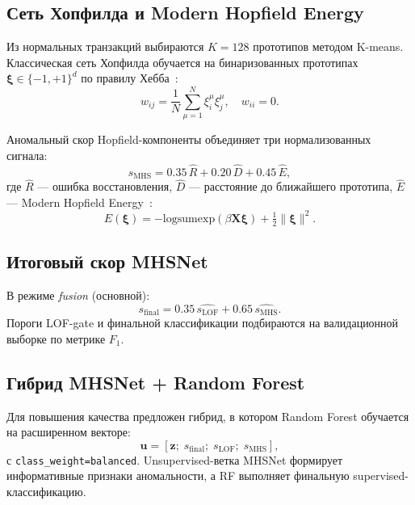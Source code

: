 \documentclass[12pt,a4paper]{article}
\begin{document}
\subsection{Сеть Хопфилда и Modern Hopfield Energy}

Из нормальных транзакций выбираются $K=128$ прототипов методом K-means.
Классическая сеть Хопфилда обучается на бинаризованных прототипах $\boldsymbol{\xi} \in \{-1,+1\}^d$
по правилу Хебба~\cite{hopfield1982}:
\begin{equation}
  w_{ij} = \frac{1}{N}\sum_{\mu=1}^{N} \xi_i^{\mu}\xi_j^{\mu}, \quad w_{ii}=0.
\end{equation}

Аномальный скор Hopfield-компоненты объединяет три нормализованных сигнала:
\begin{equation}
  s_{\mathrm{MHS}} = 0.35\,\hat{R} + 0.20\,\hat{D} + 0.45\,\hat{E},
\end{equation}
где $\hat{R}$ --- ошибка восстановления, $\hat{D}$ --- расстояние до ближайшего прототипа,
$\hat{E}$ --- Modern Hopfield Energy~\cite{ramsbauer2021}:
\begin{equation}
  E(\boldsymbol{\xi}) = -\mathrm{logsumexp}(\beta \mathbf{X}\boldsymbol{\xi}) + \tfrac{1}{2}\|\boldsymbol{\xi}\|^2.
\end{equation}

\subsection{Итоговый скор MHSNet}

В режиме \textit{fusion} (основной):
\begin{equation}
  s_{\mathrm{final}} = 0.35\,\widehat{s_{\mathrm{LOF}}} + 0.65\,\widehat{s_{\mathrm{MHS}}}.
\end{equation}
Пороги LOF-gate и финальной классификации подбираются на валидационной выборке по метрике $F_1$.

\subsection{Гибрид MHSNet + Random Forest}

Для повышения качества предложен гибрид, в котором Random Forest обучается на расширенном векторе:
\begin{equation}
  \mathbf{u} = [\mathbf{z};\; s_{\mathrm{final}};\; s_{\mathrm{LOF}};\; s_{\mathrm{MHS}}],
\end{equation}
с \texttt{class\_weight=balanced}. Unsupervised-ветка MHSNet формирует информативные признаки
аномальности, а RF выполняет финальную supervised-классификацию.
\end{document}
